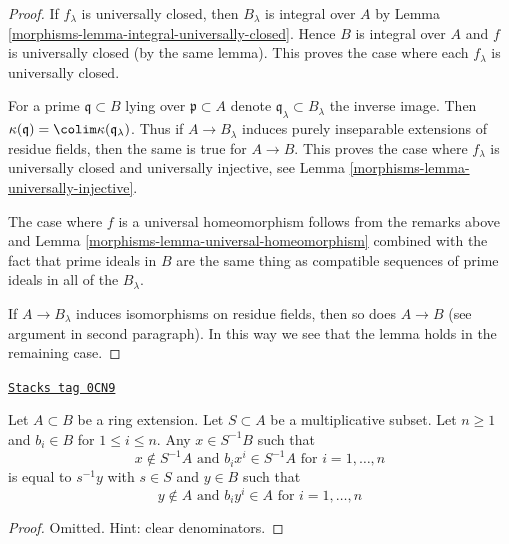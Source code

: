 \begin{proof}

If $f_\lambda$ is universally closed, then
$B_\lambda$ is integral over $A$ by
Lemma \ref{morphisms-lemma-integral-universally-closed}.
Hence $B$ is integral over $A$ and $f$
is universally closed (by the same lemma).
This proves the case where each $f_\lambda$ is universally closed.

\medskip\noindent
For a prime $\mathfrak q \subset B$ lying over $\mathfrak p \subset A$
denote $\mathfrak q_\lambda \subset B_\lambda$ the inverse image.
Then $\kappa(\mathfrak q) = \colim \kappa(\mathfrak q_\lambda)$.
Thus if $A \to B_\lambda$ induces purely inseparable extensions
of residue fields, then the same is true for $A \to B$. This proves the case
where $f_\lambda$ is universally closed and universally injective, see
Lemma \ref{morphisms-lemma-universally-injective}.

\medskip\noindent
The case where $f$ is a universal homeomorphism follows from
the remarks above and Lemma \ref{morphisms-lemma-universal-homeomorphism}
combined with the fact that prime ideals in $B$ are the same thing
as compatible sequences of prime ideals in all of the $B_\lambda$.

\medskip\noindent
If $A \to B_\lambda$ induces isomorphisms on residue fields, then
so does $A \to B$ (see argument in second paragraph).
In this way we see that the lemma holds in the remaining case.
\end{proof}

\begin{lemma}
\label{morphisms-lemma-special-elements-and-localization}
\href{https://stacks.math.columbia.edu/tag/0CN9}{\texttt{Stacks tag 0CN9}}

Let $A \subset B$ be a ring extension. Let $S \subset A$ be a
multiplicative subset. Let $n \geq 1$ and
$b_i \in B$ for $1 \leq i \leq n$. Any $x \in S^{-1}B$ such that
$$
x \not \in S^{-1}A\text{ and } b_i x^i \in S^{-1}A\text{ for }i = 1, \ldots, n
$$
is equal to $s^{-1}y$ with $s \in S$ and $y \in B$ such that
$$
y \not \in A\text{ and } b_i y^i \in A\text{ for }i = 1, \ldots, n
$$
\end{lemma}

\begin{proof}
Omitted. Hint: clear denominators.
\end{proof}

